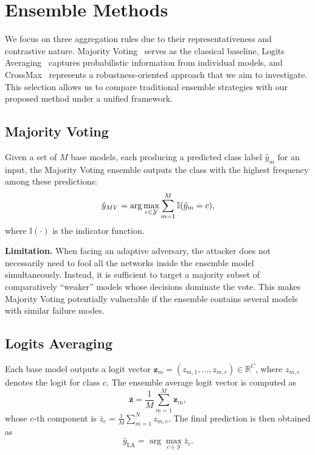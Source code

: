 \section{Ensemble Methods}
\indent

We focus on three aggregation rules due to their representativeness and contrastive nature. Majority Voting~\cite{dietterich2000ensemble} serves as the classical baseline, Logits Averaging~\cite{lakshminarayanan2017simple} captures probabilistic information from individual models, and CrossMax~\cite{fort2024ensemble} represents a robustness-oriented approach that we aim to investigate. This selection allows us to compare traditional ensemble strategies with our proposed method under a unified framework.

\subsection{Majority Voting}  
Given a set of $M$ base models, each producing a predicted class label $\hat{y}_m$ for an input, the Majority Voting ensemble outputs the class with the highest frequency among these predictions:
\begin{equation}
    \hat{y}_{\small{MV}} = \arg\max_{c \in \mathcal{Y}} \sum_{m=1}^M \mathbb{I}(\hat{y}_m = c),
\end{equation}
where $\mathbb{I}(\cdot)$ is the indicator function.

\noindent
\textbf{Limitation.}  
When facing an adaptive adversary, the attacker does not necessarily need to fool all the networks inside the ensemble model simultaneously.
Instead, it is sufficient to target a majority subset of comparatively ``weaker'' models whose decisions dominate the vote.
This makes Majority Voting potentially vulnerable if the ensemble contains several models with similar failure modes.

\subsection{Logits Averaging}  
Each base model outputs a logit vector $\mathbf{z}_m = (z_{m,1}, \dots, z_{m,c}) \in \mathbb{R}^C$, 
where $z_{m,c}$ denotes the logit for class $c$.  
The ensemble average logit vector is computed as
\begin{equation}
    \bar{\mathbf{z}} = \frac{1}{M} \sum_{m=1}^M \mathbf{z}_m,
\end{equation}
whose $c$-th component is $\bar{z}_c = \frac{1}{M}\sum_{m=1}^N z_{m,c}$. 
The final prediction is then obtained as
\begin{equation}
    \hat{y}_{\text{LA}} = \arg\max_{c \in \mathcal{Y}} \bar{z}_c.
\end{equation}


